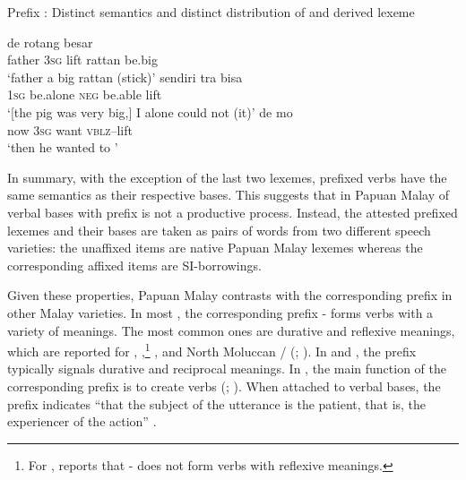 \begin{styleExampleTitle}
{Prefix : Distinct semantics and distinct distribution of  and derived lexeme}
\end{styleExampleTitle}
\ea
\label{Example_3.48}
 {de} {} {rotang} {besar}\\ %
 father  \textsc{3sg}  lift  rattan  be.big\\
\glt 
‘father  a big rattan (stick)’ \textstyleExampleSource{[080921-004a-CvNP.0084]}
\z
\ea
\label{Example_3.49}
 {sendiri} {tra} {bisa} {}\\ %
 \textsc{1sg}  be.alone  \textsc{neg}  be.able  lift\\
\glt 
‘[the pig was very big,] I alone could not  (it)’ \textstyleExampleSource{[080919-003-NP.0008]}
\z
\ea
\label{Example_3.50}
 {de} {mo} {}\\ %
 now  \textsc{3sg}  want  \textsc{vblz}–lift\\
\glt 
‘then he wanted to ’ \textstyleExampleSource{[080919-007-CvNP.0023]}
\z


In summary, with the exception of the last two lexemes, prefixed verbs have the same semantics as their respective bases. This suggests that in Papuan Malay  of verbal bases with prefix  is not a productive process. Instead, the attested prefixed lexemes and their bases are taken as pairs of words from two different speech varieties: the unaffixed items are native Papuan Malay lexemes whereas the corresponding affixed items are SI-borrowings.



Given these properties, Papuan Malay  contrasts with the corresponding prefix in other Malay varieties. In most , the corresponding prefix - forms verbs with a variety of meanings. The most common ones are durative and reflexive meanings, which are reported for  \citep[96–98]{vanMinde.1997},  \citep[249--250]{Paauw.2009},\footnote{For , \citet[249]{Paauw.2009} reports that - does not form verbs with reflexive meanings.}  \citep[18–22]{Stoel.2005}, and North Moluccan /  (\citealt[18]{Taylor.1983}; \citealt[125–127]{Litamahuputty.2012}). In  \citep[46–49]{Steinhauer.1983} and  \citep[249–254-255]{Paauw.2009}, the prefix typically signals durative and reciprocal meanings. In , the main function of the corresponding prefix  is to create  verbs (\citealt[131]{Englebretson.2003}; \citeyear*[96]{Englebretson.2007}). When attached to verbal bases, the prefix indicates “that the subject of the utterance is the patient, that is, the experiencer of the action” \citep[134–138]{Mintz.1994}.


